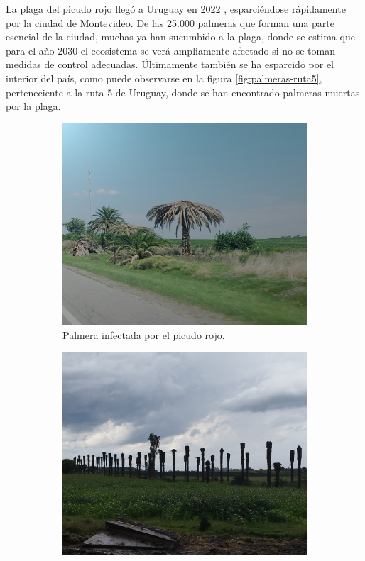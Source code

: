 La plaga del picudo rojo llegó a Uruguay en 2022 \citep{mgap_informacion_nodate}, esparciéndose rápidamente por la ciudad de Montevideo. De las 25.000 palmeras que forman una parte esencial de la ciudad, muchas ya han sucumbido a la plaga, donde se estima que para el año 2030 el ecosistema se verá ampliamente afectado \citep{arcos_picudo_2024} si no se toman medidas de control adecuadas. Últimamente también se ha esparcido por el interior del país, como puede observarse en la figura \ref{fig:palmeras-ruta5}, perteneciente a la ruta 5 de Uruguay, donde se han encontrado palmeras muertas por la plaga.

\begin{figure}[htpb]
  \centering
  \begin{subfigure}[b]{0.49\textwidth}
    \centering
    \includegraphics[width=\textwidth]{./Figures/palmera-infectada.jpg}
    \caption{Palmera infectada por el picudo rojo.}
    \label{fig:palmera-infectada}
  \end{subfigure}
  \hfill
  \begin{subfigure}[b]{0.49\textwidth}
    \centering
    \includegraphics[width=.99\textwidth]{./Figures/palmeras-ruta5.jpg}

\end{subfigure}
\end{figure}
